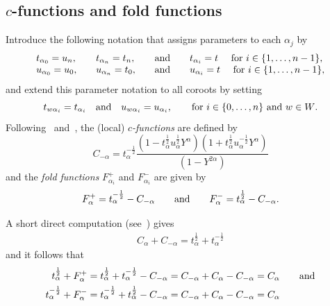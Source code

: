 \documentclass[11pt]{article}
\theoremstyle{plain}
\theoremstyle{definition}
\theoremstyle{remark}
\numberwithin{equation}{section}
\newcounter{r}
\newcounter{s}
\begin{document}
\subsection{$c$-functions and fold functions}

Introduce the following notation that assigns parameters to each $\alpha_j$ by
\begin{equation}
\begin{array}{llcl}
t_{\alpha_0}=u_n, \quad &t_{\alpha_n} = t_n, &\quad\hbox{and}\quad &t_{\alpha_i} = t\ \quad \hbox{for $i\in \{1, \ldots, n-1\}$,} \\
u_{\alpha_0}=u_0, \quad &u_{\alpha_n} = t_0, &\quad\hbox{and}\quad &u_{\alpha_i} = t\ \quad \hbox{for $i\in \{1, \ldots, n-1\}$},
\end{array}
\label{cortparams}
\end{equation}
and extend this parameter notation to all coroots by setting
\begin{equation}
t_{w\alpha_i} = t_{\alpha_i}
\quad\hbox{and}\quad
u_{w\alpha_i} = u_{\alpha_i}, \qquad\hbox{for $i\in \{0, \ldots, n\}$ and $w\in W$.}
\label{crtparext}
\end{equation}
Following~\cite[(4.2.2)]{Mac03} and~\cite[(16)]{CR24}, the (local) \emph{$c$-functions} are defined by 
\begin{equation}
C_{-\alpha} = 
t^{-\frac12}_{\alpha}
\frac{(1-t_{\alpha}^{\frac12}u_{\alpha}^{\frac12}Y^{\alpha})
(1+t_{\alpha}^{\frac12}u_{\alpha}^{-\frac12}Y^{\alpha})}
{(1-Y^{2\alpha})}
\label{cfcndefn}
\end{equation}
and the \emph{fold functions} $F^+_{\alpha_i}$ and $F^-_{\alpha_i}$ are given by
\begin{equation}
F_{\alpha}^+ = t_{\alpha}^{-\frac12} - C_{-\alpha}
\qquad\hbox{and}\qquad
F_{\alpha}^- = t_{\alpha}^{\frac12} - C_{-\alpha}.
\label{Fdefn}
\end{equation}

A short direct computation (see~\cite[(17)]{CR24}) gives
\begin{align}
C_\alpha+C_{-\alpha}  
= t_{\alpha}^{\frac12}+t_{\alpha}^{-\frac12}
\label{cplusc}
\end{align}
and it follows that
\begin{align}
t^{\frac12}_{\alpha} + F^+_{\alpha} 
&= t^{\frac12}_{\alpha} + t^{-\frac12}_{\alpha} - C_{-\alpha} 
= C_{-\alpha} + C_\alpha - C_{-\alpha} = C_\alpha
\qquad\hbox{and}
\nonumber
\\
t^{-\frac12}_{\alpha} + F^-_{\alpha}
&= t^{-\frac12}_{\alpha}+t^{\frac12}_{\alpha} - C_{-\alpha} 
=C_{-\alpha} + C_\alpha - C_{-\alpha} = C_\alpha
\label{bigC}
\end{align}
\end{document}
